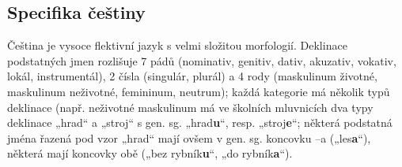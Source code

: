 \begin{multicols}{2}

\subsection{Specifika češtiny}

Čeština je vysoce flektivní jazyk s velmi složitou morfologií. Deklinace podstatných jmen rozlišuje 7 pádů (nominativ, genitiv, dativ, akuzativ, vokativ, lokál, instrumentál), 2 čísla (singulár, plurál) a 4 rody (maskulinum životné, maskulinum neživotné, femininum, neutrum); každá kategorie má několik typů deklinace (např. neživotné maskulinum má ve školních mluvnicích dva typy deklinace „hrad“ a „stroj“ s gen. sg. „hrad\textbf{u}“, resp. „stroj\textbf{e}“; některá podstatná jména řazená pod vzor „hrad“ mají ovšem v gen. sg. koncovku –a („les\textbf{a}“), některá mají koncovky obě („bez rybník\textbf{u}“, „do rybník\textbf{a}“).


\end{multicols}
